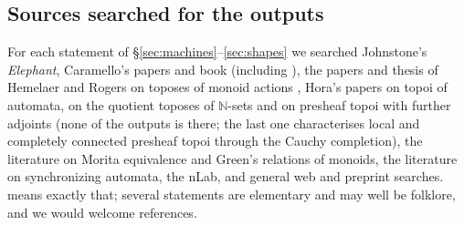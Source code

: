 \subsection{Sources searched for the outputs}

For each statement of \S\ref{sec:machines}--\ref{sec:shapes} we searched Johnstone's \emph{Elephant}, Caramello's papers and book (including \cite{caramello-chamoun}), the papers and thesis of Hemelaer and Rogers on toposes of monoid actions \cite{hemelaer-rogers,rogers-1905,rogers-thesis}, Hora's papers on topoi of automata, on the quotient toposes of $\mathbb N$-sets and on presheaf topoi with further adjoints \cite{hora-automata,hora-kamio,hora-adjoints} (none of the outputs is there; the last one characterises local and completely connected presheaf topoi through the Cauchy completion), the literature on Morita equivalence and Green's relations of monoids, the literature on synchronizing automata, the nLab, and general web and preprint searches.  means exactly that; several statements are elementary and may well be folklore, and we would welcome references.
